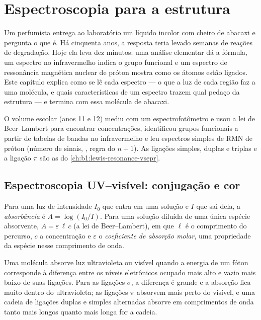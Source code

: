 \chapter{Espectroscopia para a estrutura}\label{ch:b1:structure-spectroscopy}

Um perfumista entrega ao laboratório um líquido incolor com cheiro de
abacaxi e pergunta o que é. Há cinquenta anos, a resposta teria levado
semanas de reações de degradação. Hoje ela leva dez minutos: uma
análise elementar dá a fórmula, um espectro no infravermelho indica o
grupo funcional e um espectro de ressonância magnética nuclear de próton
mostra como os átomos estão ligados. Este capítulo explica como se lê
cada espectro --- o que a luz de cada região faz a uma molécula, e quais
características de um espectro trazem qual pedaço da estrutura --- e
termina com essa molécula de abacaxi.

\begin{recall}
O volume escolar (anos 11 e 12) mediu  com um
espectrofotômetro e usou a lei de Beer--Lambert para encontrar
concentrações, identificou grupos funcionais a partir de tabelas de
bandas no infravermelho e leu espectros simples de RMN de próton (número
de sinais, , regra do $n + 1$). As ligações simples, duplas e
triplas e a ligação $\pi$ são as do \cref{ch:b1:lewis-resonance-vsepr}.
\end{recall}

\section{Espectroscopia UV--visível: conjugação e cor}

\begin{definition}\label{def:b1:structure-spectroscopy:absorbance}
Para uma luz de intensidade $I_0$ que entra em uma solução e $I$ que
sai dela, a \emph{absorbância} é $A = \log(I_0/I)$. Para uma
solução diluída de uma única espécie absorvente, $A = \varepsilon\,\ell\,c$
(a lei de Beer--Lambert), em que $\ell$ é o comprimento do percurso, $c$
a concentração e $\varepsilon$ o \emph{coeficiente de absorção
molar}, uma propriedade da espécie
nesse comprimento de onda.
\end{definition}

Uma molécula absorve luz ultravioleta ou visível quando a energia de um
fóton corresponde à diferença entre os níveis eletrônicos ocupado mais
alto e vazio mais baixo de suas ligações. Para as ligações $\sigma$, a
diferença é grande e a absorção fica muito dentro do ultravioleta; as
ligações $\pi$ absorvem mais perto do visível, e uma cadeia de ligações
duplas e simples alternadas absorve em comprimentos de onda tanto mais
longos quanto mais longa for a cadeia.

